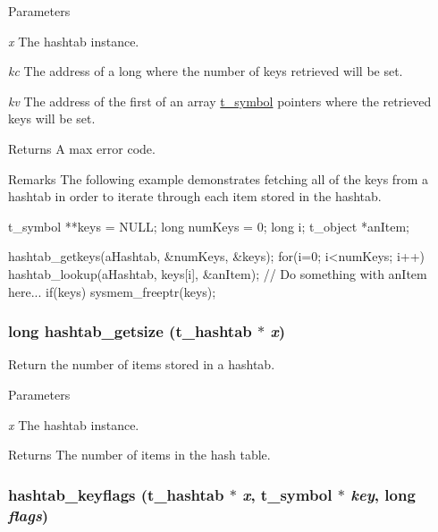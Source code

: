 \begin{DoxyParams}{Parameters}
\item[{\em x}]The hashtab instance. \item[{\em kc}]The address of a long where the number of keys retrieved will be set. \item[{\em kv}]The address of the first of an array \hyperlink{structt__symbol}{t\_\-symbol} pointers where the retrieved keys will be set. \end{DoxyParams}
\begin{DoxyReturn}{Returns}
A max error code.
\end{DoxyReturn}
\begin{DoxyRemark}{Remarks}
The following example demonstrates fetching all of the keys from a hashtab in order to iterate through each item stored in the hashtab. 
\begin{DoxyCode}
    t_symbol    **keys = NULL;
    long        numKeys = 0;
    long        i;
    t_object    *anItem;

    hashtab_getkeys(aHashtab, &numKeys, &keys);
    for(i=0; i<numKeys; i++){
        hashtab_lookup(aHashtab, keys[i], &anItem);
        // Do something with anItem here...
    }
    if(keys)
        sysmem_freeptr(keys);
\end{DoxyCode}
 
\end{DoxyRemark}
\hypertarget{group__hashtab_gaf0d337d2d3d31e2ea5a5a3bff01fe833}{
\subsubsection[{hashtab\_\-getsize}]{\setlength{\rightskip}{0pt plus 5cm}long hashtab\_\-getsize ({\bf t\_\-hashtab} $\ast$ {\em x})}}
\label{group__hashtab_gaf0d337d2d3d31e2ea5a5a3bff01fe833}


Return the number of items stored in a hashtab. 
\begin{DoxyParams}{Parameters}
\item[{\em x}]The hashtab instance. \end{DoxyParams}
\begin{DoxyReturn}{Returns}
The number of items in the hash table. 
\end{DoxyReturn}
\hypertarget{group__hashtab_gab5cb27719ed31725c46ff3ff52356aa8}{
\subsubsection[{hashtab\_\-keyflags}]{ hashtab\_\-keyflags ({\bf t\_\-hashtab} $\ast$ {\em x}, \/  {\bf t\_\-symbol} $\ast$ {\em key}, \/  long {\em flags})}}
\label{group__hashtab_gab5cb27719ed31725c46ff3ff52356aa8}


